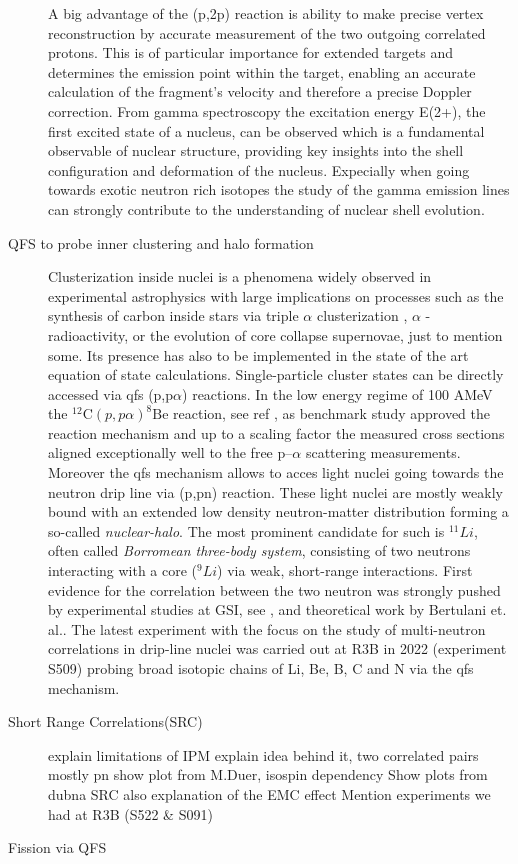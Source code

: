 \begin{description}
A big advantage of the (p,2p) reaction is ability to make precise vertex reconstruction by accurate measurement of the two outgoing correlated protons. This is of particular importance for extended targets and determines the emission point within the target, enabling an accurate calculation of the fragment’s velocity and therefore a precise Doppler correction.\newline
From gamma spectroscopy the excitation energy E(2+), the first excited state of a nucleus, can be observed which is a fundamental observable of nuclear structure, providing key insights into the shell configuration and deformation of the nucleus\cite{panin2021quasi}. Expecially when going towards exotic neutron rich isotopes the study of the gamma emission lines can strongly contribute to the understanding of nuclear shell evolution.
\item[QFS to probe inner clustering and halo formation]Clusterization inside nuclei is a phenomena widely observed in experimental astrophysics with large implications on processes such as the synthesis of carbon  inside stars via triple $\alpha$ clusterization \cite{hjorth2011carbon}, $\alpha$ - radioactivity, or the evolution of core collapse supernovae\cite{sumiyoshi2008appearance}, just to mention some. Its presence has also to be implemented in the state of the art equation of state calculations.\newline
Single-particle cluster states can be directly accessed via qfs (p,p$\alpha$) reactions. In the low energy regime of 100 AMeV the $^{12}\text{C}(p, p\alpha)^{8}\text{Be}$ reaction, see ref \cite{mabiala2009analyzing}, as benchmark study approved the reaction mechanism and up to a scaling factor the measured cross sections aligned exceptionally well to the free p–$\alpha$ scattering measurements.\newline
Moreover the qfs mechanism allows to acces light nuclei going towards the neutron drip line via (p,pn) reaction. These light nuclei are mostly weakly bound with an extended low density neutron-matter distribution forming a so-called \textit{nuclear-halo}.\newline
The most prominent candidate for such is $^{11}Li$, often called \textit{Borromean three-body system}\cite{johannsen199011li}, consisting of two neutrons interacting with a core ($^9Li$) via weak, short-range interactions. First evidence for the correlation  between the two neutron was strongly pushed by experimental studies at GSI, see \cite{simon1999direct}, and theoretical work by Bertulani et. al.\cite{bertulani2007geometry}.\newline
The latest experiment with the focus on the study of multi-neutron correlations in drip-line nuclei was carried out at R3B in 2022 (experiment S509) probing broad isotopic chains of Li, Be, B, C and N via the qfs mechanism.
\item[Short Range Correlations(SRC)]
explain limitations of IPM
explain idea behind it, two correlated pairs mostly pn
show plot from M.Duer, isospin dependency
Show plots from dubna
SRC also explanation of the EMC effect
Mention experiments we had at R3B (S522 & S091)
\item[Fission via QFS]


\end{description}
